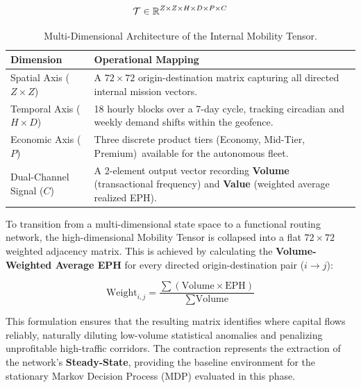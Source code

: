\begin{equation*}
    \Large \mathcal{T} \in \mathbb{R}^{Z \times Z \times H \times D \times P \times C}
\end{equation*}

\begin{table}[H]
    \centering
    \small
    \begin{tabularx}{\textwidth}{l X}
        \toprule
        \textbf{Dimension} & \textbf{Operational Mapping} \\
        \midrule
        Spatial Axis ($Z \times Z$) & A $72 \times 72$ origin-destination matrix capturing all directed internal mission vectors. \\
        \addlinespace
        Temporal Axis ($H \times D$) & 18 hourly blocks over a 7-day cycle, tracking circadian and weekly demand shifts within the geofence. \\
        \addlinespace
        Economic Axis ($P$) &  Three discrete product tiers (Economy, Mid-Tier, Premium)\footnotemark \ available for the autonomous fleet. \\
        \addlinespace
        Dual-Channel Signal ($C$) & A 2-element output vector recording \textbf{Volume} (transactional frequency) and \textbf{Value} (weighted average realized EPH). \\
        \bottomrule
    \end{tabularx}
    \caption{Multi-Dimensional Architecture of the Internal Mobility Tensor.}
    \label{tab:tensor_axes}
\end{table}


To transition from a multi-dimensional state space to a functional routing network, the high-dimensional Mobility Tensor is collapsed into a flat $72 \times 72$ weighted adjacency matrix. This is achieved by calculating the \textbf{Volume-Weighted Average EPH} for every directed origin-destination pair ($i \to j$):

\begin{equation}
    \text{Weight}_{i,j} = \frac{\sum (\text{Volume} \times \text{EPH})}{\sum \text{Volume}}
\end{equation}

This formulation ensures that the resulting matrix identifies where capital flows reliably, naturally diluting low-volume statistical anomalies and penalizing unprofitable high-traffic corridors. The contraction represents the extraction of the network's \textbf{Steady-State}, providing the baseline environment for the stationary Markov Decision Process (MDP) evaluated in this phase.


